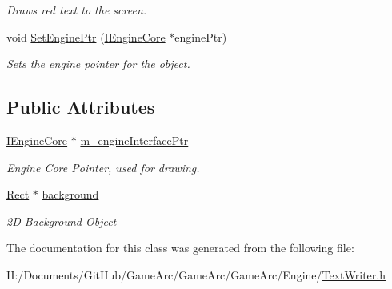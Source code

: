 \begin{DoxyCompactItemize}
\begin{DoxyCompactList}\small\item\em Draws red text to the screen. \end{DoxyCompactList}\item 
\hypertarget{class_text_writer_af0fc86c34a2eaab031625c6d4ba5cf03}{void \hyperlink{class_text_writer_af0fc86c34a2eaab031625c6d4ba5cf03}{Set\+Engine\+Ptr} (\hyperlink{class_i_engine_core}{I\+Engine\+Core} $\ast$engine\+Ptr)}\label{class_text_writer_af0fc86c34a2eaab031625c6d4ba5cf03}

\begin{DoxyCompactList}\small\item\em Sets the engine pointer for the object. \end{DoxyCompactList}\end{DoxyCompactItemize}
\subsection*{Public Attributes}
\begin{DoxyCompactItemize}
\item 
\hypertarget{class_text_writer_a322f1ca93660d2385928d301dfdcb379}{\hyperlink{class_i_engine_core}{I\+Engine\+Core} $\ast$ \hyperlink{class_text_writer_a322f1ca93660d2385928d301dfdcb379}{m\+\_\+engine\+Interface\+Ptr}}\label{class_text_writer_a322f1ca93660d2385928d301dfdcb379}

\begin{DoxyCompactList}\small\item\em Engine Core Pointer, used for drawing. \end{DoxyCompactList}\item 
\hypertarget{class_text_writer_a7b4b12710d544344e675fa7658603b61}{\hyperlink{class_rect}{Rect} $\ast$ \hyperlink{class_text_writer_a7b4b12710d544344e675fa7658603b61}{background}}\label{class_text_writer_a7b4b12710d544344e675fa7658603b61}

\begin{DoxyCompactList}\small\item\em 2\+D Background Object \end{DoxyCompactList}\end{DoxyCompactItemize}


The documentation for this class was generated from the following file\+:\begin{DoxyCompactItemize}
\item 
H\+:/\+Documents/\+Git\+Hub/\+Game\+Arc/\+Game\+Arc/\+Game\+Arc/\+Engine/\hyperlink{_text_writer_8h}{Text\+Writer.\+h}\end{DoxyCompactItemize}
